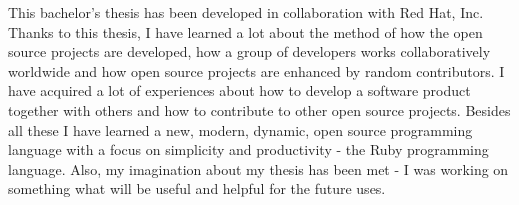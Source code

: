 This bachelor's thesis has been developed in collaboration with Red Hat, Inc. Thanks to this thesis, I have learned a lot about the method of how the open source projects are developed, how a group of developers works collaboratively worldwide and how open source projects are enhanced by random contributors. I have acquired a lot of experiences about how to develop a software product together with others and how to contribute to other open source projects. Besides all these I have learned a new, modern, dynamic, open source programming language with a focus on simplicity and productivity - the Ruby programming language. Also, my imagination about my thesis has been met - I was working on something what will be useful and helpful for the future uses.
